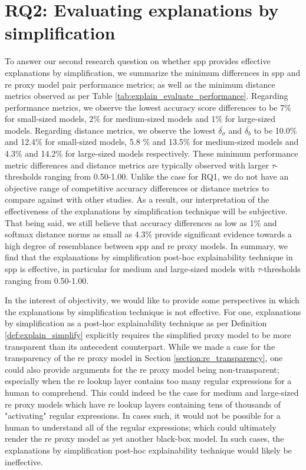 \section{RQ2: Evaluating explanations by simplification}

To answer our second research question on whether \ac{spp} provides effective
explanations by simplification, we summarize the minimum differences in \ac{spp}
and \ac{re} proxy model pair performance metrics; as well as the minimum
distance metrics observed as per Table \ref{tab:explain_evaluate_performance}.
Regarding performance metrics, we observe the lowest accuracy score differences
to be 7$\%$ for small-sized models, 2$\%$ for medium-sized models and 1$\%$ for
large-sized models. Regarding distance metrics, we observe the lowest
$\overline{\delta_{\sigma}}$ and $\overline{\delta_{b}}$ to be 10.0$\%$ and
12.4$\%$ for small-sized models, 5.8 $\%$ and 13.5$\%$ for medium-sized models
and 4.3$\%$ and 14.2$\%$ for large-sized models respectively. These minimum
performance metric differences and distance metrics are typically observed with
larger $\tau$-thresholds ranging from 0.50-1.00. Unlike the case for RQ1, we do
not have an objective range of competitive accuracy differences or distance
metrics to compare against with other studies. As a result, our interpretation
of the effectiveness of the explanations by simplification technique will be
subjective. That being said, we still believe that accuracy differences as low
as 1$\%$ and softmax distance norms as small as 4.3$\%$ provide significant
evidence towards a high degree of resemblance between \ac{spp} and \ac{re} proxy
models. In summary, we find that the explanations by simplification post-hoc
explainability technique in \ac{spp} is effective, in particular for medium and
large-sized models with $\tau$-thresholds ranging from 0.50-1.00.

In the interest of objectivity, we would like to provide some perspectives in
which the explanations by simplification technique is not effective. For one,
explanations by simplification as a post-hoc explainability technique as per
Definition \ref{def:explain_simplify} explicitly requires the simplified proxy
model to be more transparent than its antecedent counterpart. While we made a
case for the transparency of the \ac{re} proxy model in Section
\ref{section:re_transparency}, one could also provide arguments for the \ac{re} proxy
model being non-transparent; especially when the \ac{re} lookup layer contains too
many regular expressions for a human to comprehend. This could indeed be the
case for medium and large-sized \ac{re} proxy models which have \ac{re} lookup layers
containing tens of thousands of "activating" regular expressions. In cases such,
it would not be possible for a human to understand all of the regular
expressions; which could ultimately render the \ac{re} proxy model as yet another
black-box model. In such cases, the explanations by simplification post-hoc
explainability technique would likely be ineffective.

